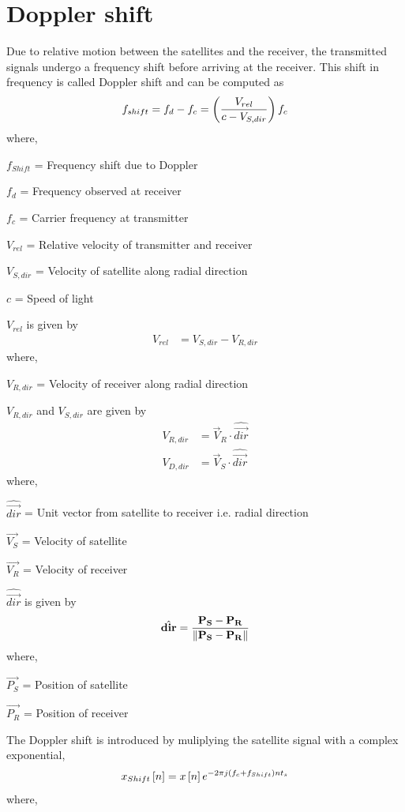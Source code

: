 \documentclass[11pt]{book}
\begin{document}
\section{Doppler shift}
Due to relative motion between the satellites and the receiver, the transmitted signals undergo a frequency shift before arriving at the receiver. This shift %
in frequency is called Doppler shift and can be computed as
\begin{equation}
    f_{shift} = f_{d}-f_{c} = \left(\frac{V_{rel}}{c-V_{S,dir}}\right)f_{c}  
\end{equation}
where,

$f_{Shift}$ = Frequency shift due to Doppler

$f_{d}$ = Frequency observed at receiver

$f_{c}$ = Carrier frequency at transmitter

$V_{rel}$ = Relative velocity of transmitter and receiver

$V_{S,dir}$ = Velocity of satellite along radial direction

$c$ = Speed of light

$V_{rel}$ is given by
\begin{align}
    V_{rel} &= V_{S,dir} - V_{R,dir}
\end{align}
where,

$V_{R,dir}$ = Velocity of receiver along radial direction

$V_{R,dir}$ and $V_{S,dir}$ are given by
\begin{align}
    V_{R,dir} &= \vec{V}_{R} \cdot \hat{\vec{dir}}\\
    V_{D,dir} &= \vec{V}_{S} \cdot \hat{\vec{dir}}
\end{align}
where,

$\hat{\vec{dir}}$ = Unit vector from satellite to receiver i.e. radial direction

$\vec{V_{S}}$ = Velocity of satellite

$\vec{V_{R}}$ = Velocity of receiver

$\hat{\vec{dir}}$ is given by
\begin{align}
    \hat{\mathbf{dir}} = \frac{\mathbf{P_{S}}-\mathbf{P_{R}}}{\left\lVert\mathbf{P_{S}}-\mathbf{P_{R}}\right\rVert}
\end{align}
where,

$\vec{P_{S}}$ = Position of satellite

$\vec{P_{R}}$ = Position of receiver


The Doppler shift is introduced by muliplying the satellite signal with a complex exponential,
\begin{equation}
    x_{Shift}{}\left[n\right] = x{}\left[n\right]e^{-2 \pi j \left(f_{c}+f_{Shift}\right) n t_{s}}
\end{equation}
where,
\end{document}
